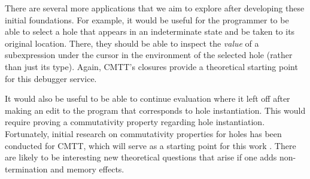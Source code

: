 \documentclass[letterpaper,USenglish]{lipics-v2016}
\begin{document}




There are several more applications that we aim to explore after developing these initial foundations. For example, it would be useful for the programmer to be able to select a hole that appears in an indeterminate state and be taken to its original location. There, they should be able to inspect the \emph{value} of a subexpression under the cursor in the environment of the selected hole (rather than just its type). Again, CMTT's closures provide a theoretical starting point for this debugger service. 

It would also be useful to be able to continue evaluation where it left off after making an edit to the program that corresponds to hole instantiation. This would require proving a commutativity property regarding hole instantiation. Fortunately, initial research on commutativity properties for holes has been conducted for CMTT, which will serve as a starting point for this work \cite{Nanevski2008}. There are likely to be interesting new theoretical questions that arise if one adds non-termination and memory effects. 
\end{document}
